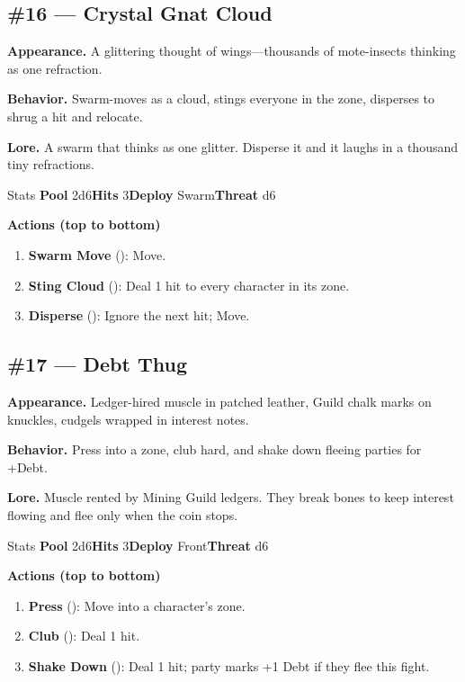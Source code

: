 \subsection*{\#16 --- Crystal Gnat Cloud}

\textbf{Appearance.} A glittering thought of wings---thousands of mote-insects thinking as one refraction.

\textbf{Behavior.} Swarm-moves as a cloud, stings everyone in the zone, disperses to shrug a hit and relocate.

\textbf{Lore.} A swarm that thinks as one glitter. Disperse it and it laughs in a thousand tiny refractions.

\begin{monsterentry}{Stats}
\textbf{Pool} 2d6\quad\textbf{Hits} 3\quad\textbf{Deploy} Swarm\quad\textbf{Threat} d6

\textbf{Actions (top to bottom)}
\begin{enumerate}\setlength{\itemsep}{0.15em}\setlength{\parskip}{0pt}
  \item \textbf{Swarm Move} (\easy): Move.
  \item \textbf{Sting Cloud} (\medium): Deal 1 hit to every character in its zone.
  \item \textbf{Disperse} (\hard): Ignore the next hit; Move.
\end{enumerate}
\end{monsterentry}

\subsection*{\#17 --- Debt Thug}

\textbf{Appearance.} Ledger-hired muscle in patched leather, Guild chalk marks on knuckles, cudgels wrapped in interest notes.

\textbf{Behavior.} Press into a zone, club hard, and shake down fleeing parties for +Debt.

\textbf{Lore.} Muscle rented by Mining Guild ledgers. They break bones to keep interest flowing and flee only when the coin stops.

\begin{monsterentry}{Stats}
\textbf{Pool} 2d6\quad\textbf{Hits} 3\quad\textbf{Deploy} Front\quad\textbf{Threat} d6

\textbf{Actions (top to bottom)}
\begin{enumerate}\setlength{\itemsep}{0.15em}\setlength{\parskip}{0pt}
  \item \textbf{Press} (\easy): Move into a character's zone.
  \item \textbf{Club} (\medium): Deal 1 hit.
  \item \textbf{Shake Down} (\hard): Deal 1 hit; party marks +1 Debt if they flee this fight.
\end{enumerate}
\end{monsterentry}

